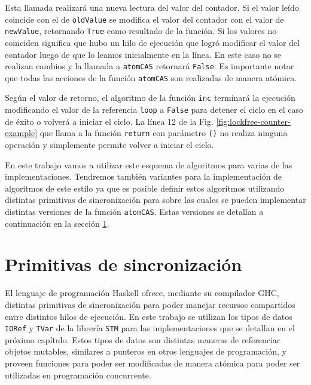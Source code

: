 Esta llamada realizará una nueva lectura del valor del contador.
Si el valor leído coincide con el de \texttt{oldValue} se modifica el valor del contador con el valor de \texttt{newValue}, retornando \texttt{True} como resultado de la función.
Si los valores no coinciden significa que hubo un hilo de ejecución que logró modificar el valor del contador luego de que lo leamos inicialmente en la línea.
En este caso no se realizan cambios y la llamada a \texttt{atomCAS} retornará \texttt{False}.
Es importante notar que todas las acciones de la función \texttt{atomCAS} son realizadas de manera atómica.

Según el valor de retorno, el algoritmo de la función \texttt{inc} terminará la ejecución modificando el valor de la referencia \texttt{loop} a \texttt{False} para detener el ciclo en el caso de éxito o volverá a iniciar el ciclo.
La línea 12 de la Fig. \ref{fig:lockfree-counter-example} que llama a la función \texttt{return} con parámetro \texttt{()} no realiza ninguna operación y simplemente permite volver a iniciar el ciclo.

En este trabajo vamos a utilizar este esquema de algoritmos para varias de las implementaciones. Tendremos también variantes para la implementación de algoritmos de este estilo ya que es posible definir estos algoritmos utilizando distintas primitivas de sincronización para sobre las cuales se pueden implementar distintas versiones de la función \texttt{atomCAS}.
Estas versiones se detallan a continuación en la sección \ref{sec:primitives}.

\section{Primitivas de sincronización} \label{sec:primitives}
El lenguaje de programación Haskell ofrece, mediante su compilador GHC, distintas primitivas de sincronización para poder manejar recursos compartidos entre distintos hilos de ejecución.
En este trabajo se utilizan los tipos de datos \texttt{IORef} y \texttt{TVar} de la librería \texttt{STM} para las implementaciones que se detallan en el próximo capítulo.
Estos tipos de datos son distintas maneras de referenciar objetos mutables, similares a punteros en otros lenguajes de programación, y proveen funciones para poder ser modificadas de manera atómica para poder ser utilizadas en programación concurrente.

